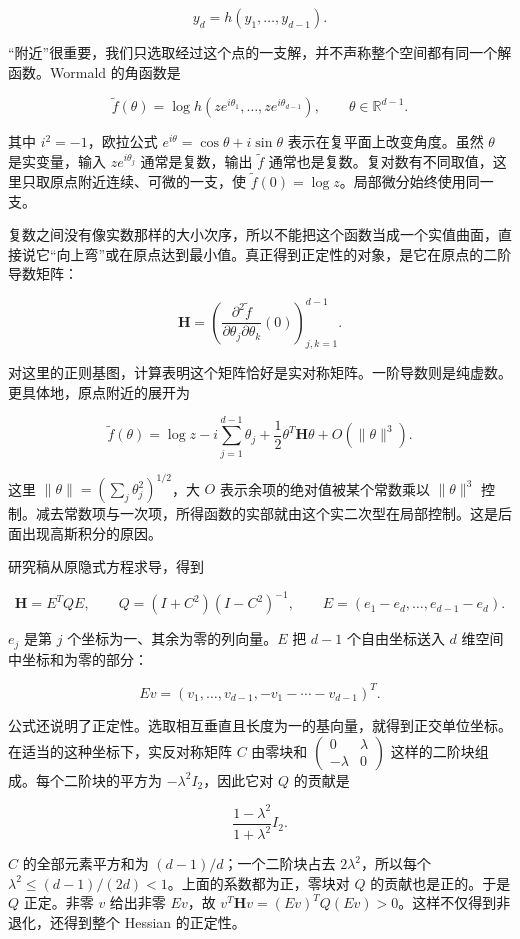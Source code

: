 \documentclass[11pt,a4paper]{article}
\begin{document}
\[y_d=h(y_1,\ldots,y_{d-1}).\]

``附近''很重要，我们只选取经过这个点的一支解，并不声称整个空间都有同一个解函数。Wormald 的角函数是

\[\widetilde f(\theta)
=\log h(ze^{i\theta_1},\ldots,ze^{i\theta_{d-1}}),
\qquad \theta\in\mathbb R^{d-1}.\]

其中 \(i^2=-1\)，欧拉公式 \(e^{i\theta}=\cos\theta+i\sin\theta\) 表示在复平面上改变角度。虽然 \(\theta\) 是实变量，输入 \(ze^{i\theta_j}\) 通常是复数，输出 \(\widetilde f\) 通常也是复数。复对数有不同取值，这里只取原点附近连续、可微的一支，使 \(\widetilde f(0)=\log z\)。局部微分始终使用同一支。

复数之间没有像实数那样的大小次序，所以不能把这个函数当成一个实值曲面，直接说它``向上弯''或在原点达到最小值。真正得到正定性的对象，是它在原点的二阶导数矩阵：

\[\mathbf H=
\left(\frac{\partial^2\widetilde f}
{\partial\theta_j\partial\theta_k}(0)\right)_{j,k=1}^{d-1}.\]

对这里的正则基图，计算表明这个矩阵恰好是实对称矩阵。一阶导数则是纯虚数。更具体地，原点附近的展开为

\[\widetilde f(\theta)
=\log z-i\sum_{j=1}^{d-1}\theta_j
+\frac12\theta^T\mathbf H\theta
+O(\|\theta\|^3).\]

这里 \(\|\theta\|=(\sum_j\theta_j^2)^{1/2}\)，大 \(O\) 表示余项的绝对值被某个常数乘以 \(\|\theta\|^3\) 控制。减去常数项与一次项，所得函数的实部就由这个实二次型在局部控制。这是后面出现高斯积分的原因。

研究稿从原隐式方程求导，得到

\[\mathbf H=E^TQE,\qquad
Q=(I+C^2)(I-C^2)^{-1},\qquad
E=(e_1-e_d,\ldots,e_{d-1}-e_d).\]

\(e_j\) 是第 \(j\) 个坐标为一、其余为零的列向量。\(E\) 把 \(d-1\) 个自由坐标送入 \(d\) 维空间中坐标和为零的部分：

\[Ev=(v_1,\ldots,v_{d-1},-v_1-\cdots-v_{d-1})^T.\]

公式还说明了正定性。选取相互垂直且长度为一的基向量，就得到正交单位坐标。在适当的这种坐标下，实反对称矩阵 \(C\) 由零块和 \(\left(\begin{smallmatrix}0&\lambda\\-\lambda&0\end{smallmatrix}\right)\) 这样的二阶块组成。每个二阶块的平方为 \(-\lambda^2I_2\)，因此它对 \(Q\) 的贡献是

\[\frac{1-\lambda^2}{1+\lambda^2}I_2.\]

\(C\) 的全部元素平方和为 \((d-1)/d\)；一个二阶块占去 \(2\lambda^2\)，所以每个 \(\lambda^2\le(d-1)/(2d)<1\)。上面的系数都为正，零块对 \(Q\) 的贡献也是正的。于是 \(Q\) 正定。非零 \(v\) 给出非零 \(Ev\)，故 \(v^T\mathbf Hv=(Ev)^TQ(Ev)>0\)。这样不仅得到非退化，还得到整个 Hessian 的正定性。
\end{document}
